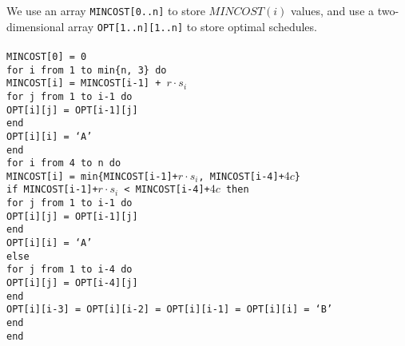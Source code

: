 \documentclass[12pt,letterpaper]{article}
\begin{document}
We use an array \texttt{MINCOST[0..n]} to store $MINCOST(i)$ values, and use a two-dimensional array \texttt{OPT[1..n][1..n]} to store optimal schedules. 
\\\tt
\\
MINCOST[0] = 0\\
for i from 1 to min\{n, 3\} do\\
\mbox{\hspace{2em}}MINCOST[i] = MINCOST[i-1] + $r\cdot s_i$\\
\mbox{\hspace{2em}}for j from 1 to i-1 do\\
\mbox{\hspace{4em}}OPT[i][j] = OPT[i-1][j]\\
\mbox{\hspace{2em}}end\\
\mbox{\hspace{2em}}OPT[i][i] = `A'\\
end\\
for i from 4 to n do\\
\mbox{\hspace{2em}}MINCOST[i] = min\{MINCOST[i-1]+$r\cdot s_i$, MINCOST[i-4]+$4c$\}\\
\mbox{\hspace{2em}}if MINCOST[i-1]+$r\cdot s_i$ < MINCOST[i-4]+$4c$ then\\
\mbox{\hspace{4em}}for j from 1 to i-1 do\\
\mbox{\hspace{6em}}OPT[i][j] = OPT[i-1][j]\\
\mbox{\hspace{4em}}end\\
\mbox{\hspace{4em}}OPT[i][i] = `A'\\
\mbox{\hspace{2em}}else\\
\mbox{\hspace{4em}}for j from 1 to i-4 do\\
\mbox{\hspace{6em}}OPT[i][j] = OPT[i-4][j]\\
\mbox{\hspace{4em}}end\\
\mbox{\hspace{4em}}OPT[i][i-3] = OPT[i][i-2] = OPT[i][i-1] = OPT[i][i] = `B'\\
\mbox{\hspace{2em}}end\\
end\\
\rm
\end{document}
